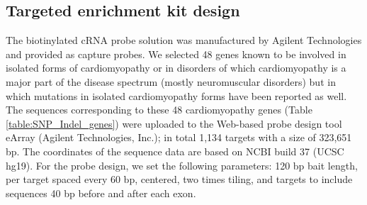 \subsection{Targeted enrichment kit design}
The biotinylated cRNA probe solution was manufactured by Agilent Technologies and provided as capture probes. 
We selected 48 genes known to be involved in isolated forms of cardiomyopathy or in disorders of which cardiomyopathy is a major part of the disease spectrum (mostly neuromuscular disorders) but in which mutations in isolated cardiomyopathy forms have been reported as well. 
The sequences corresponding to these 48 cardiomyopathy genes (Table \ref{table:SNP_Indel_genes}) were uploaded to the Web-based probe design tool eArray (Agilent Technologies, Inc.); in total 1,134 targets with a size of 323,651 bp. 
The coordinates of the sequence data are based on NCBI build 37 (UCSC hg19). 
For the probe design, we set the following parameters: 120 bp bait length, per target spaced every 60 bp, centered, two times tiling, and targets to include sequences 40 bp before and after each exon.


